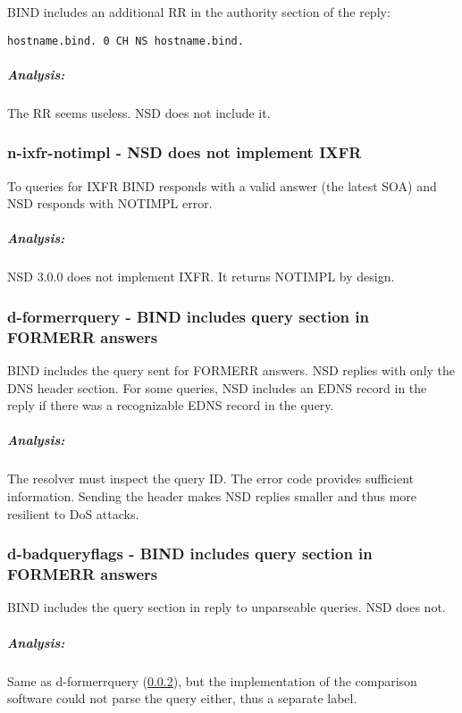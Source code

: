 \documentclass[twoside,titlepage,english]{nlnetlabs}
\begin{document}
BIND includes an additional RR in the authority section of the reply:
\footnotesize
\begin{verbatim}
hostname.bind. 0 CH NS hostname.bind.
\end{verbatim}
\normalsize

\vspace{-8pt}\subparagraph{Analysis:}

The RR seems useless. NSD does not include it.


\subsubsection{n-ixfr-notimpl - NSD does not implement IXFR}
\label{n-ixfr-notimpl}

To queries for IXFR BIND responds with a valid answer (the latest SOA)
and NSD responds with NOTIMPL error.

\vspace{-8pt}\subparagraph{Analysis:}

NSD 3.0.0 does not implement IXFR. It returns NOTIMPL by design.


\subsubsection{d-formerrquery - BIND includes query section in FORMERR answers}
\label{d-formerrquery}

BIND includes the query sent for FORMERR answers. NSD replies with only
the DNS header section. For some queries, NSD includes an EDNS record in 
the reply if there was a recognizable EDNS record in the query.

\vspace{-8pt}\subparagraph{Analysis:}

The resolver must inspect the query ID. The error code provides sufficient
information. Sending the header makes NSD replies smaller and thus more 
resilient to DoS attacks.


\subsubsection{d-badqueryflags - BIND includes query section in FORMERR answers}
\label{d-badqueryflags}

BIND includes the query section in reply to unparseable queries. NSD does not.

\vspace{-8pt}\subparagraph{Analysis:}

Same as d-formerrquery (\ref{d-formerrquery}), but the implementation of the comparison 
software could not parse the query either, thus a separate label.
\end{document}
